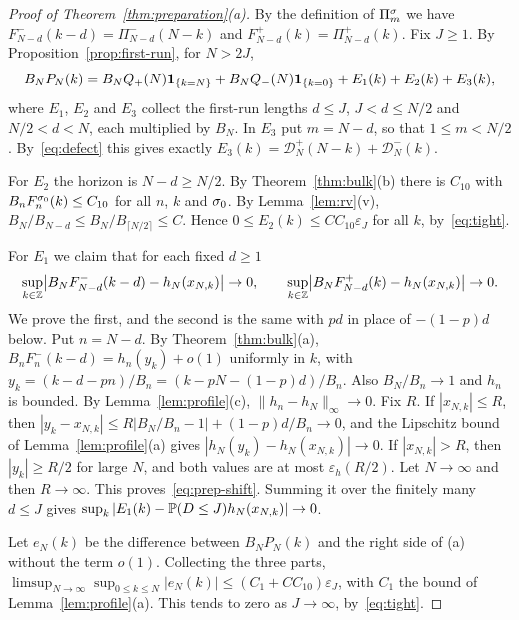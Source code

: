 \begin{proof}[Proof of Theorem~\ref{thm:preparation}(a)]
By the definition of $\Pi^\sigma_m$ we have $F^\minus_{N-d}(k-d)=\Pi^\minus_{N-d}(N-k)$ and
$F^\plus_{N-d}(k)=\Pi^\plus_{N-d}(k)$. Fix $J\ge1$. By
Proposition~\ref{prop:first-run}, for $N>2J$,
\[
 B_NP_N(k)=B_NQ_{+}(N)\mathbf{1}_{\{k=N\}}+B_NQ_{-}(N)\mathbf{1}_{\{k=0\}}+E_1(k)+E_2(k)+E_3(k),
\]
where $E_1$, $E_2$ and $E_3$ collect the first-run lengths $d\le J$, $J<d\le N/2$ and
$N/2<d<N$, each multiplied by $B_N$. In $E_3$ put $m=N-d$, so that $1\le m<N/2$.
By~\eqref{eq:defect} this gives exactly $E_3(k)=\mathcal D^\plus_N(N-k)+\mathcal D^\minus_N(k)$.

For $E_2$ the horizon is $N-d\ge N/2$. By Theorem~\ref{thm:bulk}(b) there is $C_{10}$
with $B_nF^{\sigma_0}_n(k)\le C_{10}$ for all $n$, $k$ and $\sigma_0$. By
Lemma~\ref{lem:rv}(v), $B_N/B_{N-d}\le B_N/B_{\lceil N/2\rceil}\le C$. Hence
$0\le E_2(k)\le CC_{10}\varepsilon_J$ for all $k$, by~\eqref{eq:tight}.

For $E_1$ we claim that for each fixed $d\ge1$
\begin{equation}\label{eq:prep-shift}
 \sup_{k\in\mathbb{Z}}\bigl|B_NF^{-}_{N-d}(k-d)-h_N(x_{N,k})\bigr|\to0,\qquad
 \sup_{k\in\mathbb{Z}}\bigl|B_NF^{+}_{N-d}(k)-h_N(x_{N,k})\bigr|\to0 .
\end{equation}
We prove the first, and the second is the same with $pd$ in place of $-(1-p)d$
below. Put $n=N-d$. By Theorem~\ref{thm:bulk}(a),
$B_nF^\minus_n(k-d)=h_n(y_k)+o(1)$ uniformly in $k$, with
$y_k=(k-d-pn)/B_n=(k-pN-(1-p)d)/B_n$. Also $B_N/B_n\to1$ and $h_n$ is bounded. By
Lemma~\ref{lem:profile}(c), $\lVert h_n-h_N\rVert_\infty\to0$. Fix $R$. If
$|x_{N,k}|\le R$, then $|y_k-x_{N,k}|\le R|B_N/B_n-1|+(1-p)d/B_n\to0$, and the
Lipschitz bound of Lemma~\ref{lem:profile}(a) gives $|h_N(y_k)-h_N(x_{N,k})|\to0$. If
$|x_{N,k}|>R$, then $|y_k|\ge R/2$ for large $N$, and both values are at most
$\varepsilon_h(R/2)$. Let $N\to\infty$ and then $R\to\infty$. This
proves~\eqref{eq:prep-shift}. Summing it over the finitely many $d\le J$ gives
$\sup_k|E_1(k)-\mathbb{P}(D\le J)h_N(x_{N,k})|\to0$.

Let $e_N(k)$ be the difference between $B_NP_N(k)$ and the right side of (a)
without the term $o(1)$. Collecting the three parts,
$\limsup_{N\to\infty}\sup_{0\le k\le N}|e_N(k)|\le(C_1+CC_{10})\varepsilon_J$, with $C_1$
the bound of Lemma~\ref{lem:profile}(a). This tends to zero as $J\to\infty$,
by~\eqref{eq:tight}.
\end{proof}

